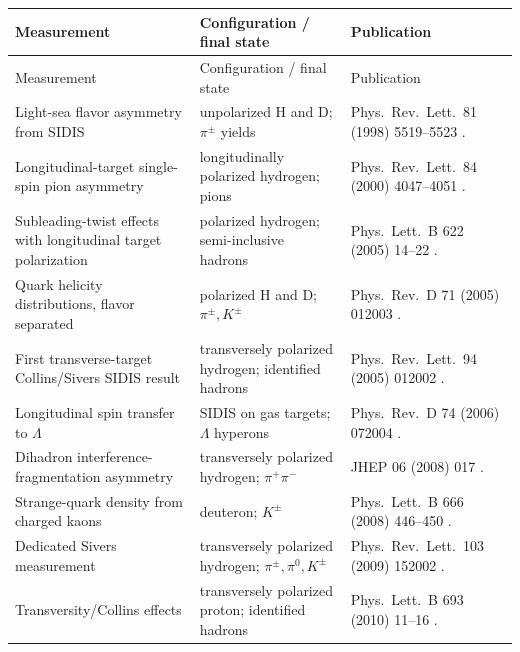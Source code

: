 \documentclass[11pt]{article}
\begin{document}
\small
\begin{longtable}{@{}p{}p{}p{}@{}}
\toprule
Measurement & Configuration / final state & Publication \\ \midrule
\endfirsthead
\toprule
Measurement & Configuration / final state & Publication \\ \midrule
\endhead
Light-sea flavor asymmetry from SIDIS &
unpolarized H and D; $\pi^\pm$ yields &
Phys.\ Rev.\ Lett.\ 81 (1998) 5519--5523 \cite{HERMES:sea1998}. \\

Longitudinal-target single-spin pion asymmetry &
longitudinally polarized hydrogen; pions &
Phys.\ Rev.\ Lett.\ 84 (2000) 4047--4051 \cite{HERMES:UL2000}. \\

Subleading-twist effects with longitudinal target polarization &
polarized hydrogen; semi-inclusive hadrons &
Phys.\ Lett.\ B 622 (2005) 14--22 \cite{HERMES:UL2005}. \\

Quark helicity distributions, flavor separated &
polarized H and D; $\pi^\pm,K^\pm$ &
Phys.\ Rev.\ D 71 (2005) 012003 \cite{HERMES:helicity2005}. \\

First transverse-target Collins/Sivers SIDIS result &
transversely polarized hydrogen; identified hadrons &
Phys.\ Rev.\ Lett.\ 94 (2005) 012002 \cite{HERMES:transverse2005}. \\

Longitudinal spin transfer to $\Lambda$ &
SIDIS on gas targets; $\Lambda$ hyperons &
Phys.\ Rev.\ D 74 (2006) 072004 \cite{HERMES:Lambda2006}. \\

Dihadron interference-fragmentation asymmetry &
transversely polarized hydrogen; $\pi^+\pi^-$ &
JHEP 06 (2008) 017 \cite{HERMES:dihadron2008}. \\

Strange-quark density from charged kaons &
deuteron; $K^\pm$ &
Phys.\ Lett.\ B 666 (2008) 446--450 \cite{HERMES:strange2008}. \\

Dedicated Sivers measurement &
transversely polarized hydrogen; $\pi^\pm,\pi^0,K^\pm$ &
Phys.\ Rev.\ Lett.\ 103 (2009) 152002 \cite{HERMES:Sivers2009}. \\

Transversity/Collins effects &
transversely polarized proton; identified hadrons &
Phys.\ Lett.\ B 693 (2010) 11--16 \cite{HERMES:Collins2010}. \\


\end{longtable}
\end{document}
